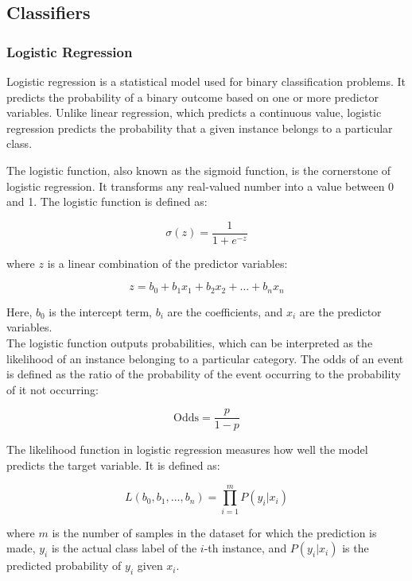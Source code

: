 \subsection{Classifiers}

\subsubsection{Logistic Regression}
Logistic regression is a statistical model used for binary classification problems. It predicts the probability of a binary outcome based on one or more predictor variables. Unlike linear regression, which predicts a continuous value, logistic regression predicts the probability that a given instance belongs to a particular class.

The logistic function, also known as the sigmoid function, is the cornerstone of logistic regression. It transforms any real-valued number into a value between 0 and 1. The logistic function is defined as:

\begin{equation}
    \sigma(z) = \frac{1}{1 + e^{-z}}
\end{equation}

where \(z\) is a linear combination of the predictor variables:

\begin{equation}
    z = b_0 + b_1x_1 + b_2x_2 + \ldots + b_nx_n
\end{equation}

Here, \(b_0\) is the intercept term, \(b_i\) are the coefficients, and \(x_i\) are the predictor variables.\\

The logistic function outputs probabilities, which can be interpreted as the likelihood of an instance belonging to a particular category. The odds of an event is defined as the ratio of the probability of the event occurring to the probability of it not occurring:

\begin{equation}
    \text{Odds} = \frac{p}{1-p}
\end{equation}

The likelihood function in logistic regression measures how well the model predicts the target variable. It is defined as:

\begin{equation}
    L(b_0, b_1, \ldots, b_n) = \prod_{i=1}^{m} P(y_i|x_i)
\end{equation}

where \(m\) is the number of samples in the dataset for which the prediction is made, \(y_i\) is the actual class label of the \(i\)-th instance, and \(P(y_i|x_i)\) is the predicted probability of \(y_i\) given \(x_i\).\\


